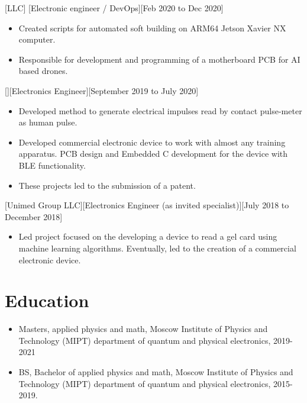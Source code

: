 \documentclass{article}
\begin{document}
[LLC]
[Electronic engineer / DevOps][Feb 2020 to Dec 2020]
\begin{itemize}
\item Created scripts for automated soft building on ARM64 Jetson Xavier NX computer.
\item Responsible for development and programming of a motherboard PCB for AI based drones.
\end{itemize}
 
[][Electronics Engineer][September 2019 to July 2020]
\begin{itemize}
\item Developed method to generate electrical impulses read by contact pulse-meter as human pulse. 
\item Developed commercial electronic device to work with almost any training apparatus. PCB design and Embedded C development for the device with BLE functionality. 
\item These projects led to the submission of a patent.
\end{itemize}
 
[Unimed Group LLC][Electronics Engineer (as invited specialist)][July 2018 to December 2018]
 
\begin{itemize}
\item Led project focused on the developing a device to read a gel card using machine learning algorithms. Eventually, led to the creation of a commercial electronic device.
\end{itemize}
 
 
\section{Education}
 
\begin{itemize}
\item Masters, applied physics and math, Moscow Institute of Physics and Technology (MIPT) department of quantum and physical electronics, 2019-2021
\item BS, Bachelor of applied physics and math, Moscow Institute of Physics and Technology (MIPT) department of quantum and physical electronics, 2015-2019.
\end{itemize}
\end{document}
